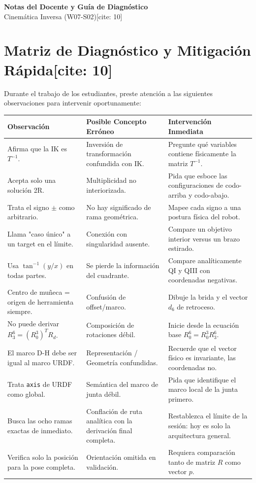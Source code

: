 \documentclass[11pt, a4paper]{article}
\begin{document}
\begin{center}
    \Large\textbf{\textcolor{red!80!black}{Notas del Docente y Guía de Diagnóstico}}\\[0.2cm]
    \normalsize Cinemática Inversa (W07-S02)[cite: 10]
\end{center}

\section*{Matriz de Diagnóstico y Mitigación Rápida[cite: 10]}
Durante el trabajo de los estudiantes, preste atención a las siguientes observaciones para intervenir oportunamente:

\renewcommand{\arraystretch}{1.3}
\begin{tabularx}{\textwidth}{|>{\hsize=0.8\hsize}X|>{\hsize=1.0\hsize}X|>{\hsize=1.2\hsize}X|}
\hline
\rowcolor{ucbblue!10} \textbf{Observación} & \textbf{Posible Concepto Erróneo} & \textbf{Intervención Inmediata} \\ \hline
Afirma que la IK es $T^{-1}$. & Inversión de transformación confundida con IK. & Pregunte qué variables contiene físicamente la matriz $T^{-1}$. \\ \hline
Acepta solo una solución 2R. & Multiplicidad no interiorizada. & Pida que esboce las configuraciones de codo-arriba y codo-abajo. \\ \hline
Trata el signo $\pm$ como arbitrario. & No hay significado de rama geométrica. & Mapee cada signo a una postura física del robot. \\ \hline
Llama "caso único" a un target en el límite. & Conexión con singularidad ausente. & Compare un objetivo interior versus un brazo estirado. \\ \hline
Usa $\tan^{-1}(y/x)$ en todas partes. & Se pierde la información del cuadrante. & Compare analíticamente QI y QIII con coordenadas negativas. \\ \hline
Centro de muñeca = origen de herramienta siempre. & Confusión de offset/marco. & Dibuje la brida y el vector $d_6$ de retroceso. \\ \hline
No puede derivar $R_3^6 = (R_0^3)^TR_d$. & Composición de rotaciones débil. & Inicie desde la ecuación base $R_0^6 = R_0^3 R_3^6$. \\ \hline
El marco D-H debe ser igual al marco URDF. & Representación / Geometría confundidas. & Recuerde que el vector físico es invariante, las coordenadas no. \\ \hline
Trata \texttt{axis} de URDF como global. & Semántica del marco de junta débil. & Pida que identifique el marco local de la junta primero. \\ \hline
Busca las ocho ramas exactas de inmediato. & Conflación de ruta analítica con la derivación final completa. & Restablezca el límite de la sesión: hoy es solo la arquitectura general. \\ \hline
Verifica solo la posición para la pose completa. & Orientación omitida en validación. & Requiera comparación tanto de matriz $R$ como vector $p$. \\ \hline
\end{tabularx}
\end{document}
